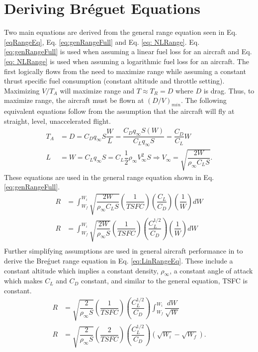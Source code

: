 \section{Deriving Br\'eguet Equations}
\label{section: derive equations}
Two main equations are derived from the general range equation seen in Eq. \ref{eqRangeEq}, Eq. \ref{eq:genRangeFull} and Eq. \ref{eq: NLRange}. Eq. \ref{eq:genRangeFull} is used when assuming a linear fuel loss for an aircraft and Eq. \ref{eq: NLRange} is used when assuming a logarithmic fuel loss for an aircraft. The first logically flows from the need to maximize range while assuming a constant thrust specific fuel consumption (constant altitude and throttle setting). Maximizing $V/T_A$ will maximize range and $T \approx T_R = D$ where $D$ is drag. Thus, to maximize range, the aircraft must be flown at $(D/V)_{min}$. The following equivalent equations follow from the assumption that the aircraft will fly at straight, level, unaccelerated flight.
\begin{align}
    T_A&=D = C_Dq_{\infty}S \dfrac{W}{L} = \dfrac{C_Dq_{\infty}S(W)}{C_Lq_{\infty}S} = \dfrac{C_D}{C_L}W\\
    L &= W = C_Lq_{\infty}S = C_L\dfrac{1}{2}\rho_{\infty}V^2_{\infty}S \Rightarrow V_{\infty} = \sqrt{\dfrac{2W}{\rho_{\infty}C_LS}}.
    \label{eq: VequivalentEq}
\end{align}
These equations are used in the general range equation shown in Eq. \ref{eq:genRangeFull}.
\begin{equation}
\label{eq:genRangeFull}
    \begin{aligned}
        R &= \int_{W_f}^{W_i}\sqrt{\dfrac{2W}{\rho_{\infty}C_LS}}\left(\dfrac{1}{TSFC}\right)\left(\dfrac{C_L}{C_D}\right)\left(\dfrac{1}{W}\right)dW\\
        R &= \int_{W_f}^{W_i}\sqrt{\dfrac{2W}{\rho_{\infty}S}}\left(\dfrac{1}{TSFC}\right)\left(\dfrac{C_L^{1/2}}{C_D}\right)\left(\dfrac{1}{W}\right)dW\\
    \end{aligned}
\end{equation}
Further simplifying assumptions are used in general aircraft performance in \cite{IntroACMechanics} to derive the Bre\'guet range equation in Eq. \ref{eq:LinRangeEq}. These include a constant altitude which implies a constant density, $\rho_{\infty}$, a constant angle of attack which makes $C_L$ and $C_D$ constant, and similar to the general equation, TSFC is constant.
\begin{equation}
\label{eq:LinRangeEq}
    \begin{aligned}
        R &= \sqrt{\dfrac{2}{\rho_{\infty}S}}\left(\dfrac{1}{TSFC}\right)\left(\dfrac{C_L^{1/2}}{C_D}\right)\int_{W_f}^{W_i}\dfrac{dW}{\sqrt{W}}\\
        R &= \sqrt{\dfrac{2}{\rho_{\infty}S}}\left(\dfrac{2}{TSFC}\right)\left(\dfrac{C_L^{1/2}}{C_D}\right)(\sqrt{W_i}-\sqrt{W_f}).
    \end{aligned}
\end{equation} \par
